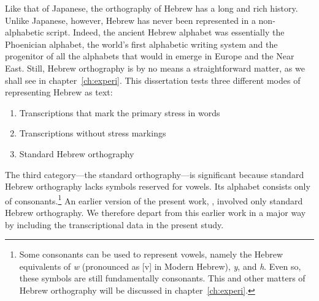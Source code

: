 Like that of Japanese, the orthography of Hebrew has a long and rich history. Unlike Japanese, however, Hebrew has never been represented in a non-alphabetic script. Indeed, the ancient Hebrew alphabet was essentially the Phoenician alphabet, the world's first alphabetic writing system and the progenitor of all the alphabets that would in emerge in Europe and the Near East. Still, Hebrew orthography is by no means a straightforward matter, as we shall see in chapter~\ref{ch:experi}.
This dissertation tests three different modes of representing Hebrew as text:
\begin{enumerate}
\item Transcriptions that mark the primary stress in words
\item Transcriptions without stress markings 
\item Standard Hebrew orthography 
\end{enumerate} 
The third category---the standard orthography---is significant because standard Hebrew 
orthography lacks symbols reserved for vowels. Its alphabet consists only of consonants.\footnote{Some consonants can be used to represent vowels, namely the Hebrew equivalents of \textit{w} (pronounced as [v] in Modern Hebrew), \textit{y}, and \textit{h}. Even so, these symbols are still fundamentally consonants. This and other matters of Hebrew orthography will be discussed in chapter~\ref{ch:experi}.} An earlier version of the present work, \citet{meyer-and-dickinson:2016}, involved only standard Hebrew orthography. We therefore depart from this earlier work in a major way by including the transcriptional data in the present study. 

